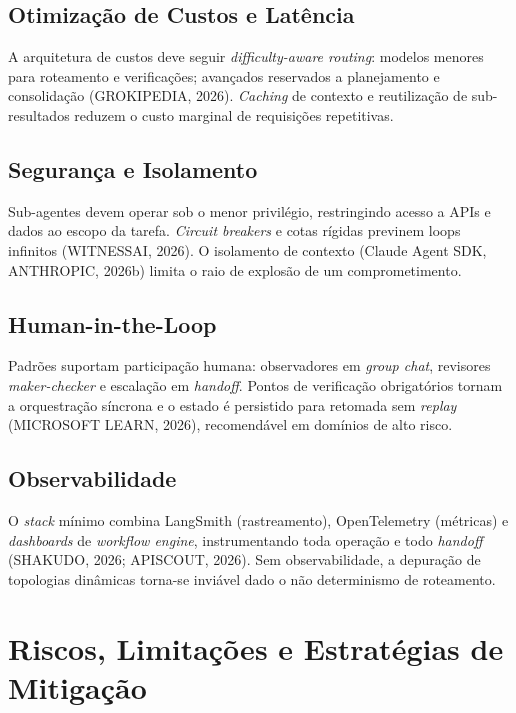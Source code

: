 \documentclass[12pt,a4paper]{article}
\begin{document}
\subsection{Otimização de Custos e Latência}

A arquitetura de custos deve seguir \textit{difficulty-aware routing}: modelos menores para roteamento e verificações; avançados reservados a planejamento e consolidação (GROKIPEDIA, 2026). \textit{Caching} de contexto e reutilização de sub-resultados reduzem o custo marginal de requisições repetitivas.

\subsection{Segurança e Isolamento}

Sub-agentes devem operar sob o menor privilégio, restringindo acesso a APIs e dados ao escopo da tarefa. \textit{Circuit breakers} e cotas rígidas previnem loops infinitos (WITNESSAI, 2026). O isolamento de contexto (Claude Agent SDK, ANTHROPIC, 2026b) limita o raio de explosão de um comprometimento.

\subsection{Human-in-the-Loop}

Padrões suportam participação humana: observadores em \textit{group chat}, revisores \textit{maker-checker} e escalação em \textit{handoff}. Pontos de verificação obrigatórios tornam a orquestração síncrona e o estado é persistido para retomada sem \textit{replay} (MICROSOFT LEARN, 2026), recomendável em domínios de alto risco.

\subsection{Observabilidade}

O \textit{stack} mínimo combina LangSmith (rastreamento), OpenTelemetry (métricas) e \textit{dashboards} de \textit{workflow engine}, instrumentando toda operação e todo \textit{handoff} (SHAKUDO, 2026; APISCOUT, 2026). Sem observabilidade, a depuração de topologias dinâmicas torna-se inviável dado o não determinismo de roteamento.


\section{Riscos, Limitações e Estratégias de Mitigação}
\end{document}
